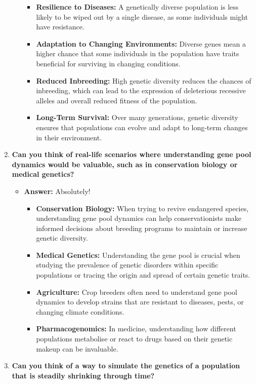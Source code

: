 \documentclass[
  a4paper]{book}
\providecommand{\tightlist}{%
  \setlength{\itemsep}{0pt}\setlength{\parskip}{0pt}}
\begin{document}
\begin{enumerate}
\begin{itemize}
    \begin{itemize}
    \tightlist
    \item
      \textbf{Resilience to Diseases:} A genetically diverse population is less likely to be wiped out by a single disease, as some individuals might have resistance.
    \item
      \textbf{Adaptation to Changing Environments:} Diverse genes mean a higher chance that some individuals in the population have traits beneficial for surviving in changing conditions.
    \item
      \textbf{Reduced Inbreeding:} High genetic diversity reduces the chances of inbreeding, which can lead to the expression of deleterious recessive alleles and overall reduced fitness of the population.
    \item
      \textbf{Long-Term Survival:} Over many generations, genetic diversity ensures that populations can evolve and adapt to long-term changes in their environment.
    \end{itemize}
  \end{itemize}
\item
  \textbf{Can you think of real-life scenarios where understanding gene pool dynamics would be valuable, such as in conservation biology or medical genetics?}

  \begin{itemize}
  \tightlist
  \item
    \textbf{Answer:} Absolutely!

    \begin{itemize}
    \tightlist
    \item
      \textbf{Conservation Biology:} When trying to revive endangered species, understanding gene pool dynamics can help conservationists make informed decisions about breeding programs to maintain or increase genetic diversity.
    \item
      \textbf{Medical Genetics:} Understanding the gene pool is crucial when studying the prevalence of genetic disorders within specific populations or tracing the origin and spread of certain genetic traits.
    \item
      \textbf{Agriculture:} Crop breeders often need to understand gene pool dynamics to develop strains that are resistant to diseases, pests, or changing climate conditions.
    \item
      \textbf{Pharmacogenomics:} In medicine, understanding how different populations metabolise or react to drugs based on their genetic makeup can be invaluable.
    \end{itemize}
  \end{itemize}
\item
  \textbf{Can you think of a way to simulate the genetics of a population that is steadily shrinking through time?}


\end{enumerate}
\end{document}
